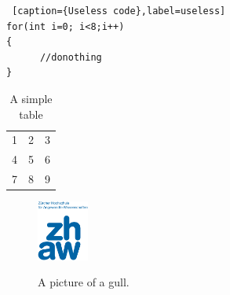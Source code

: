 %
%
\begin{lstlisting} [caption={Useless code},label=useless]
for(int i=0; i<8;i++) 
{
      //donothing
}
\end{lstlisting}


%
%
\cite{Sch96:crypt}


%
%
\begin{table}[h!]
  \begin{center}
    \begin{tabular}{| l c r |}
    \hline
    1 & 2 & 3 \\
    4 & 5 & 6 \\
    7 & 8 & 9 \\
    \hline
    \end{tabular}
  \end{center}
  \caption{A simple table}
\end{table}

%
%
\begin{figure}[h!]
  \centering
    \includegraphics[width=0.15\textwidth, natwidth=500, natheight=586]{./img/logo_zhaw.png}\\[2cm]
  \caption{A picture of a gull.}
\end{figure}
